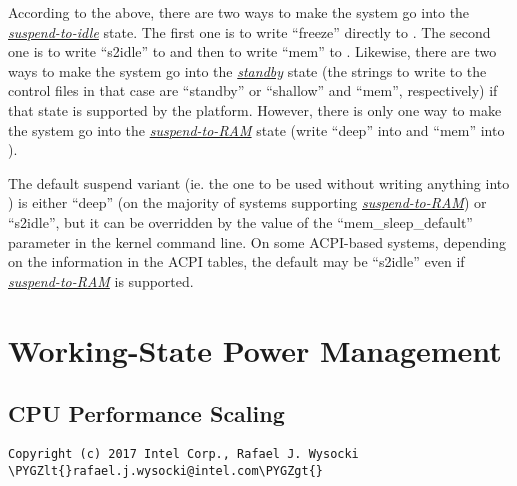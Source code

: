 \documentclass[a4paper,8pt,english]{sphinxmanual}
\def\PYGZlt{\char`\<}
\def\PYGZgt{\char`\>}
\begin{document}
According to the above, there are two ways to make the system go into the
{\hyperref[admin\string-guide/pm/sleep\string-states:s2idle]{\emph{suspend-to-idle}}} state.  The first one is to write ``freeze''
directly to .  The second one is to write ``s2idle'' to
 and then to write ``mem'' to
.  Likewise, there are two ways to make the system go
into the {\hyperref[admin\string-guide/pm/sleep\string-states:standby]{\emph{standby}}} state (the strings to write to the control
files in that case are ``standby'' or ``shallow'' and ``mem'', respectively) if that
state is supported by the platform.  However, there is only one way to make the
system go into the {\hyperref[admin\string-guide/pm/sleep\string-states:s2ram]{\emph{suspend-to-RAM}}} state (write ``deep'' into
 and ``mem'' into ).

The default suspend variant (ie. the one to be used without writing anything
into ) is either ``deep'' (on the majority of systems
supporting {\hyperref[admin\string-guide/pm/sleep\string-states:s2ram]{\emph{suspend-to-RAM}}}) or ``s2idle'', but it can be overridden
by the value of the ``mem\_sleep\_default'' parameter in the kernel command line.
On some ACPI-based systems, depending on the information in the ACPI tables, the
default may be ``s2idle'' even if {\hyperref[admin\string-guide/pm/sleep\string-states:s2ram]{\emph{suspend-to-RAM}}} is supported.


\section{Working-State Power Management}
\label{admin-guide/pm/working-state:working-state-power-management}\label{admin-guide/pm/working-state::doc}

\subsection{CPU Performance Scaling}
\label{admin-guide/pm/cpufreq:cpu-performance-scaling}\label{admin-guide/pm/cpufreq::doc}
\begin{Verbatim}[commandchars=\\\{\}]
Copyright (c) 2017 Intel Corp., Rafael J. Wysocki \PYGZlt{}rafael.j.wysocki@intel.com\PYGZgt{}
\end{Verbatim}
\end{document}
